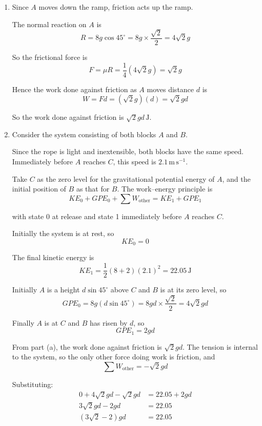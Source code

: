 \documentclass[leqno]{article}
\begin{document}
\begin{enumerate}[
  label=\textbf{\arabic*.},
  leftmargin=*,
  topsep=0pt,
  partopsep=0pt,
  parsep=0pt
]
\vspace*{10pt}

\begin{djsSolution}
\begin{enumerate}[label=\textbf{(\alph*)}]
  \item Since $A$ moves down the ramp, friction acts up the ramp.

  The normal reaction on $A$ is
  \[
  R=8g\cos45^\circ=8g\times \frac{\sqrt2}{2}=4\sqrt2 g
  \]

  So the frictional force is
  \[
  F=\mu R=\frac14(4\sqrt2 g)=\sqrt2 g
  \]

  Hence the work done against friction as $A$ moves distance $d$ is
  \[
  W=Fd=(\sqrt2 g)(d)=\sqrt2 gd
  \]

  So the work done against friction is $\sqrt2 gd\,\mathrm{J}$.

  \item Consider the system consisting of both blocks $A$ and $B$.

  Since the rope is light and inextensible, both blocks have the same speed. Immediately before $A$ reaches $C$, this speed is $2.1\,\mathrm{m\,s^{-1}}$.

  Take $C$ as the zero level for the gravitational potential energy of $A$, and the initial position of $B$ as that for $B$. The work--energy principle is
  \[
  KE_0+GPE_0+\sum W_{\text{other}}=KE_1+GPE_1
  \]

  with state 0 at release and state 1 immediately before $A$ reaches $C$.

  Initially the system is at rest, so
  \[
  KE_0=0
  \]

  The final kinetic energy is
  \[
  KE_1=\frac12(8+2)(2.1)^2=22.05\,\mathrm{J}
  \]

  Initially $A$ is a height $d\sin45^\circ$ above $C$ and $B$ is at its zero level, so
  \[
  GPE_0=8g(d\sin45^\circ)=8gd\times \frac{\sqrt2}{2}=4\sqrt2 gd
  \]

  Finally $A$ is at $C$ and $B$ has risen by $d$, so
  \[
  GPE_1=2gd
  \]

  From part (a), the work done against friction is $\sqrt2 gd$. The tension is internal to the system, so the only other force doing work is friction, and
  \[
  \sum W_{\text{other}}=-\sqrt2 gd
  \]

  Substituting:
  \begin{align*}
  0+4\sqrt2 gd-\sqrt2 gd&=22.05+2gd \\
  3\sqrt2 gd-2gd&=22.05 \\
  (3\sqrt2-2)gd&=22.05
  \end{align*}


\end{enumerate}
\end{djsSolution}
\end{enumerate}
\end{document}
